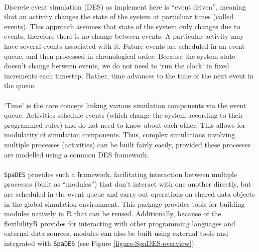 \documentclass{article}
\begin{document}
\paragraph{}
Discrete event simulation (DES) as implement here is ``event driven'', meaning that an activity changes the state of the system at particluar times (called events). This approach assumes that state of the system only changes due to events, therefore there is no change between events. A particular activity may have several events associated with it. Future events are scheduled in an event queue, and then processed in chronological order.  Because the system state doesn't change between events, we do not need to `run the clock' in fixed increments each timestep. Rather, time advances to the time of the next event in the queue.

\paragraph{}
`Time' is the core concept linking various simulation components via the event queue. Activities schedule events (which change the system according to their programmed rules) and do not need to know about each other. This allows for modularity of simulation components. Thus, complex simulations involving multiple processes (activities) can be built fairly easily, provided these processes are modelled using a common DES framework.

\paragraph{}
\texttt{SpaDES} provides such a framework, facilitating interaction between multiple processes (built as ``modules'') that don't interact with one another directly, but are scheduled in the event queue and carry out operations on shared data objects in the global simulation environment. This package provides tools for building modules natively in \textsf{R} that can be reused. Additionally, because of the flexibility\textsf{R} provides for interacting with other programming languages and external data sources, modules can also be built using external tools and integrated with \texttt{SpaDES} (see Figure \ref{figure-SpaDES-overview}).
\end{document}
